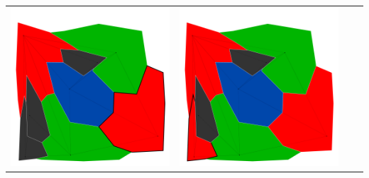 \documentclass[10pt,a4paper]{article}
\begin{document}
\begin{tabular}{c c c c }
	\includegraphics[scale=.10]{../results/backtracking_simple/map_build/bt_simple_I00009.pdf}&
	\includegraphics[scale=.10]{../results/backtracking_simple/map_build/bt_simple_I00010.pdf}&

\end{tabular}
\end{document}
